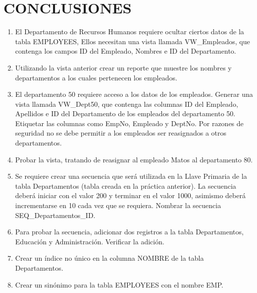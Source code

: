 \section{CONCLUSIONES} 
		
\begin{enumerate}[1.]
	\item El Departamento de Recursos Humanos requiere ocultar ciertos datos de la tabla EMPLOYEES, Ellos necesitan una vista llamada VW\_Empleados, que contenga los campos ID del Empleado, Nombres e ID del Departamento.
	\item Utilizando la vista anterior crear un reporte que muestre los nombres y departamentos a los cuales
pertenecen los empleados.
	\item El departamento 50 requiere acceso a los datos de los empleados. Generar una vista llamada VW\_Dept50, que contenga las columnas ID del Empleado, Apellidos e ID del Departamento de los empleados del departamento 50. Etiquetar las columnas como EmpNo, Empleado y DeptNo. Por razones de seguridad no se debe permitir a los empleados ser reasignados a otros departamentos.
	\item Probar la vista, tratando de reasignar al empleado Matos al departamento 80.
	\item Se requiere crear una secuencia que será utilizada en la Llave Primaria de la tabla Departamentos (tabla creada en la práctica anterior). La secuencia deberá iniciar con el valor 200 y terminar en el valor 1000, asimismo deberá incrementarse en 10 cada vez que se requiera. Nombrar la secuencia SEQ\_Departamentos\_ID.
	\item Para probar la secuencia, adicionar dos registros a la tabla Departamentos, Educación y Administración. Verificar la adición.
	\item Crear un índice no único en la columna NOMBRE de la tabla Departamentos.
	\item Crear un sinónimo para la tabla EMPLOYEES con el nombre EMP.
\end{enumerate}

